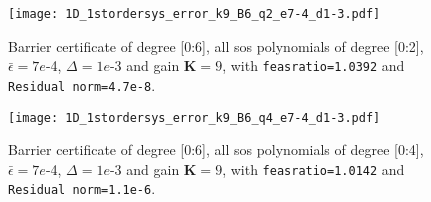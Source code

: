
\begin{figure}[htbp]
\centering
\texttt{[image: 1D\_1stordersys\_error\_k9\_B6\_q2\_e7-4\_d1-3.pdf]}
\caption{Barrier certificate of degree [0:6], all \gls{sos} polynomials of degree [0:2], $\bar{\epsilon}=7e$-4, $\Delta=1e$-3 and gain $\textbf{K}=9$, with \texttt{feasratio=1.0392} and \texttt{Residual norm=4.7e-8}.}
\label{fig:1D_1stordersys_error_k9_B6_q2_e7-4_d1-3}
\end{figure}



\begin{figure}[htbp]
\centering
\texttt{[image: 1D\_1stordersys\_error\_k9\_B6\_q4\_e7-4\_d1-3.pdf]}
\caption{Barrier certificate of degree [0:6], all \gls{sos} polynomials of degree [0:4], $\bar{\epsilon}=7e$-4, $\Delta=1e$-3 and gain $\textbf{K}=9$, with \texttt{feasratio=1.0142} and \texttt{Residual norm=1.1e-6}.}
\label{fig:1D_1stordersys_error_k9_B6_q4_e7-4_d1-3}
\end{figure}


